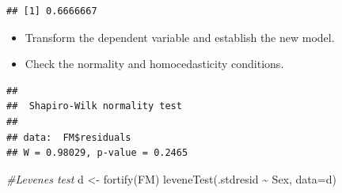 \documentclass[
]{article}
\newenvironment{Shaded}{\begin{snugshade}}{\end{snugshade}}
\newcommand{\AttributeTok}[1]{\textcolor[rgb]{0.77,0.63,0.00}{#1}}
\newcommand{\CommentTok}[1]{\textcolor[rgb]{0.56,0.35,0.01}{\textit{#1}}}
\newcommand{\DecValTok}[1]{\textcolor[rgb]{0.00,0.00,0.81}{#1}}
\newcommand{\FloatTok}[1]{\textcolor[rgb]{0.00,0.00,0.81}{#1}}
\newcommand{\FunctionTok}[1]{\textcolor[rgb]{0.00,0.00,0.00}{#1}}
\newcommand{\NormalTok}[1]{#1}
\newcommand{\OtherTok}[1]{\textcolor[rgb]{0.56,0.35,0.01}{#1}}
\newcommand{\SpecialCharTok}[1]{\textcolor[rgb]{0.00,0.00,0.00}{#1}}
\providecommand{\tightlist}{%
  \setlength{\itemsep}{0pt}\setlength{\parskip}{0pt}}
\begin{document}
\begin{verbatim}
## [1] 0.6666667
\end{verbatim}

\begin{itemize}
\tightlist
\item
  Transform the dependent variable and establish the new model.
\end{itemize}

\begin{Shaded}
\end{Shaded}

\begin{itemize}
\tightlist
\item
  Check the normality and homocedasticity conditions.
\end{itemize}

\begin{Shaded}
\end{Shaded}

\begin{verbatim}
## 
##  Shapiro-Wilk normality test
## 
## data:  FM$residuals
## W = 0.98029, p-value = 0.2465
\end{verbatim}

\begin{Shaded}
\begin{Highlighting}[]
\CommentTok{\#Levene\textquotesingle{}s test}
\NormalTok{d }\OtherTok{\textless{}{-}} \FunctionTok{fortify}\NormalTok{(FM)}
\FunctionTok{leveneTest}\NormalTok{(.stdresid }\SpecialCharTok{\textasciitilde{}}\NormalTok{ Sex, }\AttributeTok{data=}\NormalTok{d)}
\end{Highlighting}
\end{Shaded}
\end{document}
